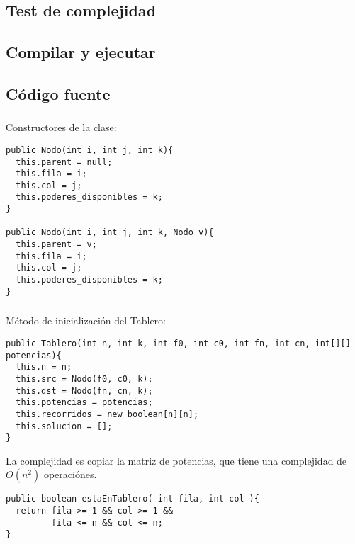 \subsection{Test de complejidad}

\subsection{Compilar y ejecutar}

\subsection{C\'odigo fuente}

\subsubsection{}

Constructores de la clase: 

\footnotesize\footnotesize\begin{verbatim}
public Nodo(int i, int j, int k){
  this.parent = null;
  this.fila = i; 
  this.col = j; 
  this.poderes_disponibles = k;
}

public Nodo(int i, int j, int k, Nodo v){
  this.parent = v;
  this.fila = i; 
  this.col = j; 
  this.poderes_disponibles = k;
}
\end{verbatim}\normalsize\normalsize

\subsubsection{}

M\'etodo de inicializaci\'on del Tablero: 

\footnotesize\begin{verbatim}
public Tablero(int n, int k, int f0, int c0, int fn, int cn, int[][] potencias){
  this.n = n;
  this.src = Nodo(f0, c0, k);
  this.dst = Nodo(fn, cn, k);
  this.potencias = potencias;
  this.recorridos = new boolean[n][n];
  this.solucion = [];
}
\end{verbatim}\normalsize

La complejidad es copiar la matriz de potencias, que tiene una complejidad de $O(n^2)$ operaci\'ones. 

\footnotesize\begin{verbatim}
public boolean estaEnTablero( int fila, int col ){
  return fila >= 1 && col >= 1 &&
         fila <= n && col <= n;
}
\end{verbatim}\normalsize

